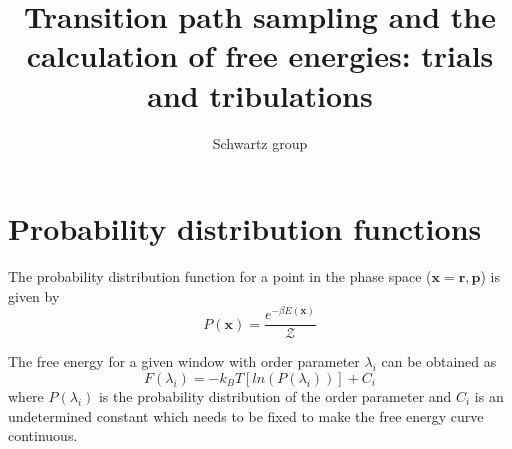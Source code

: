 \documentclass{article}
\title{Transition path sampling and the calculation of free energies: trials and tribulations}
\author{Schwartz group}
\begin{document}
\maketitle
\section*{Probability distribution functions}

The probability distribution function for a point in the phase space ($\mathbf{x} = {\mathbf{r,p}}$) is given by 
\begin{equation}
P(\mathbf{x}) = \frac{e^{-\beta E(\mathbf{x})}}{\mathcal{Z}}
\end{equation}


The free energy for a given window with order parameter $\lambda_i$ can be obtained as 
\begin{equation}
F(\lambda_i) = -k_{B}T[ln(P(\lambda_i))] + C_i
\end{equation}
where $P(\lambda_i)$ is the probability distribution of the order parameter and $C_i$ is an 
undetermined constant which needs to be fixed to make the free energy curve continuous.  
\end{document}
